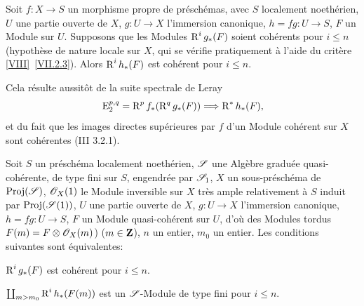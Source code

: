 \begin{proposition} \label{XII.5.1}
Soit $f:X\to S$ un morphisme propre de pr\'esch\'emas, avec $S$ localement noeth\'erien, $U$ une partie ouverte de $X$, $g:U\to X$ l'immersion canonique, $h=fg:U\to S$, $F$ un Module sur $U$. Supposons que les Modules $\operatorname{R}^ig_\ast(F)$ soient coh\'erents pour $i\leq n$ (hypoth\`ese de nature locale sur $X$, qui se v\'erifie pratiquement \`a l'aide du crit\`ere \ref{VIII}~\ref{VII.2.3}). Alors $\operatorname{R}^ih_\ast(F)$ est coh\'erent pour $i\leq n$.
\end{proposition}

Cela r\'esulte aussit\^{o}t de la suite spectrale de Leray
\steco
\begin{equation} \label{eq:XII.26} {} \E_2^{p, q}=\R^pf_\ast(\R^qg_\ast(F)) \To \R^\ast h_\ast(F),
\end{equation}
et du fait que les images directes sup\'erieures par $f$ d'un Module coh\'erent sur $X$ sont coh\'erentes (\EGA III 3.2.1).

\begin{proposition} \label{XII.5.2}
Soit $S$ un pr\'esch\'ema localement noeth\'erien, ${\mathscr S}$ une Alg\`ebre gradu\'ee quasi-coh\'erente, de type fini sur $S$, engendr\'ee par ${\mathscr S}_1$, $X$ un sous-pr\'esch\'ema de $\operatorname{Proj}({\mathscr S})$, $\mathscr{O}_X(1)$ le Module inversible sur $X$ tr\`es ample relativement \`a $S$ induit par $\operatorname{Proj}({\mathscr S}(1))$, $U$ une partie ouverte de $X$, $g:U\to X$ l'immersion canonique, $h=fg:U\to S$, $F$ un Module quasi-coh\'erent sur $U$, d'o\`u des Modules tordus $F(m)=F\otimes \mathscr{O}_X(m)$) ($m\in\mathbf{Z}$), $n$ un entier, $m_0$ un entier. Les conditions suivantes sont \'equivalentes:
\begin{enumeratei}
\item
$\operatorname{R}^ig_\ast(F)$ est coh\'erent pour $i\leq n$.
\item
$\coprod_{m>m_0}\operatorname{R}^ih_\ast(F(m))$ est un ${\mathscr S}$-Module de type fini pour $i\leq n$.
\end{enumeratei}
\end{proposition}

